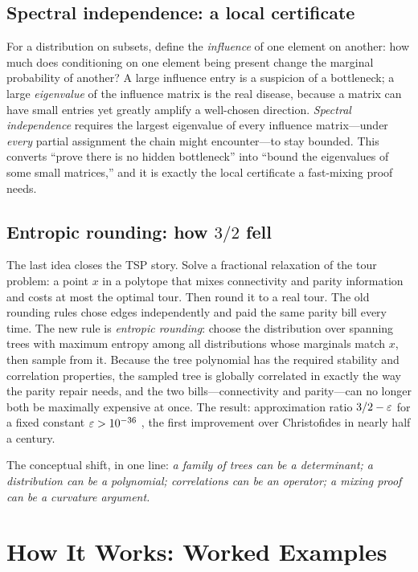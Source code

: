 \subsection{Spectral independence: a local certificate}
For a distribution on subsets, define the \emph{influence} of one element on another: how much does conditioning on one element being present change the marginal probability of another? A large influence entry is a suspicion of a bottleneck; a large \emph{eigenvalue} of the influence matrix is the real disease, because a matrix can have small entries yet greatly amplify a well-chosen direction. \emph{Spectral independence} requires the largest eigenvalue of every influence matrix---under \emph{every} partial assignment the chain might encounter---to stay bounded. This converts ``prove there is no hidden bottleneck'' into ``bound the eigenvalues of some small matrices,'' and it is exactly the local certificate a fast-mixing proof needs.

\subsection{Entropic rounding: how $3/2$ fell}
The last idea closes the TSP story. Solve a fractional relaxation of the tour problem: a point $x$ in a polytope that mixes connectivity and parity information and costs at most the optimal tour. Then round it to a real tour. The old rounding rules chose edges independently and paid the same parity bill every time. The new rule is \emph{entropic rounding}: choose the distribution over spanning trees with maximum entropy among all distributions whose marginals match $x$, then sample from it. Because the tree polynomial has the required stability and correlation properties, the sampled tree is globally correlated in exactly the way the parity repair needs, and the two bills---connectivity and parity---can no longer both be maximally expensive at once. The result: approximation ratio $3/2-\varepsilon$ for a fixed constant $\varepsilon>10^{-36}$ \cite{karlin-tsp}, the first improvement over Christofides in nearly half a century.

The conceptual shift, in one line: \emph{a family of trees can be a determinant; a distribution can be a polynomial; correlations can be an operator; a mixing proof can be a curvature argument.}

\section{How It Works: Worked Examples}
